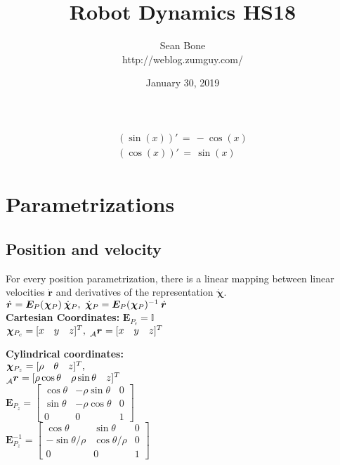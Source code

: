 \documentclass[a4paper, 8pt]{extarticle}
\title{Robot Dynamics HS18}
\author{Sean Bone \\ http://weblog.zumguy.com/ }
\date{ January 30, 2019 }
\newcommand{\mvec}[3]{  \prescript{}{\mathcal{#1}}{\bm{#2}}  _{#3} }
\newcommand{\mdvec}[3]{ \prescript{}{\mathcal{#1}}{\dot{\bm #2}} _{#3} }
\begin{document}
\begin{multicols*}{3}

\maketitle

\begin{align*}
\boxed{\begin{smallmatrix}
(\sin(x))'\, =\, -\cos(x)\\
(\cos(x))'\, =\, \sin(x)
\end{smallmatrix}}
\end{align*}

\section{Parametrizations}
\subsection{Position and velocity}
For every position parametrization, there is a linear mapping between linear velocities $\dot{\bm{r}}$ and derivatives of the representation $\dot{\bm{\chi}}$.\\
$\mdvec{}{r}{} = \bm{E}_P(\mvec{}{\chi}{P})\mdvec{}{\chi}{P},\; \mdvec{}{\chi}{P} = \bm{E}_P(\mvec{}{\chi}{P})^{-1}\mdvec{}{r}{}$\\

\noindent\textbf{Cartesian Coordinates:} $\bm{E}_{P_c} = \mathbb{I}$\\
$\mvec{}{\chi}{P_c} = [x \quad y \quad z]^T,\; \mvec{A}{r}{} = [x \quad y \quad z]^T$

\noindent\textbf{Cylindrical coordinates:}\\
$\mvec{}{\chi}{P_z} = [\rho \quad \theta \quad z]^T,$\\
$\mvec{A}{r}{} = [\rho\cos\theta \quad \rho\sin\theta \quad z]^T$\\
$\bm E_{P_z} = 
\left[\begin{smallmatrix} 
\cos\theta  &  -\rho\sin\theta  &  0\\
\sin\theta  &  -\rho\cos\theta  &  0\\
0 & 0 & 1
\end{smallmatrix}\right]$\\
$\bm E_{P_z}^{-1} = 
\left[\begin{smallmatrix} 
\cos\theta  &  \sin\theta  &  0\\
-\sin\theta/\rho  &  \cos\theta/\rho  &  0\\
0 & 0 & 1
\end{smallmatrix}\right]$\\


\end{multicols*}
\end{document}

